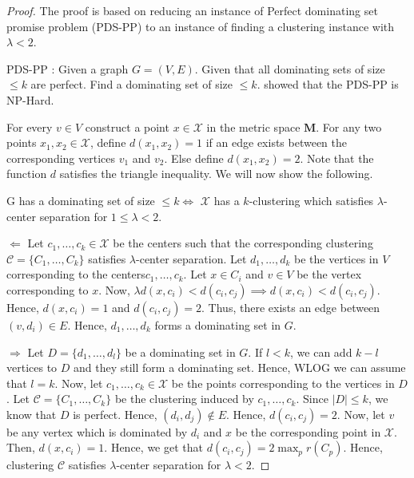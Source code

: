 \documentclass[anon,12pt]{colt2016} %
\newcommand{\mc}{\mathcal}
\newcommand{\mb}{\mathbf}
\begin{document}
\begin{proof}
The proof is based on reducing an instance of Perfect dominating set promise problem (PDS-PP) to an instance of finding a clustering instance with $\lambda < 2$.

PDS-PP : Given a graph $G = (V, E)$. Given that all dominating sets of size $\le k$ are perfect. Find a dominating set of size $\le k$. \cite{reyzin2012data} showed that the PDS-PP is NP-Hard. 

For every $v \in V$ construct a point $x \in \mc X$ in the metric space $\mb M$. For any two points $x_1, x_2 \in \mc X$, define $d(x_1, x_2) = 1$ if an edge exists between the corresponding vertices $v_1$ and $v_2$. Else define $d(x_1, x_2) = 2$. Note that the function $d$ satisfies the triangle inequality. We will now show the following.

G has a dominating set of size $\le k \iff$ $\mc X$ has a $k$-clustering which satisfies $\lambda$-center separation for $1 \le \lambda < 2$.

$\Leftarrow$  Let $c_1, \ldots, c_k \in \mc X$ be the centers such that the corresponding clustering $\mc C = \{C_1, \ldots, C_k\}$ satisfies $\lambda$-center separation. Let $d_1, \ldots, d_k$ be the vertices in $V$ corresponding to the centers$c_1, \ldots, c_k$. Let $x \in C_i$ and $v \in V$ be the vertex corresponding to $x$. Now, $\lambda d(x, c_i) < d(c_i, c_j) \implies d(x, c_i) < d(c_i, c_j)$. Hence, $d(x, c_i) = 1$ and $d(c_i, c_j) = 2$. Thus, there exists an edge between $(v, d_i) \in E$. Hence, $d_1, \ldots, d_k$ forms a dominating set in $G$.

$\Rightarrow$ Let $D = \{d_1, \ldots, d_l\}$ be a dominating set in $G$. If $l < k$, we can add $k-l$ vertices to $D$ and they still form a dominating set. Hence, WLOG we can assume that $l = k$. Now, let $c_1, \ldots, c_k \in \mc X$ be the points corresponding to the vertices in $D$. Let $\mc C = \{C_1, \ldots, C_k\}$ be the clustering induced by $c_1, \ldots, c_k$. Since $|D| \le k$, we know that $D$ is perfect. Hence, $(d_i, d_j) \not\in E$. Hence, $d(c_i, c_j) = 2$. Now, let $v$ be any vertex which is dominated by $d_i$ and $x$ be the corresponding point in $\mc X$. Then, $d(x, c_i) = 1$. Hence, we get that $d(c_i, c_j) = 2 \max_p r(C_p)$. Hence, clustering $\mc C$ satisfies $\lambda$-center separation for $\lambda < 2$.
\end{proof}

\end{document}
